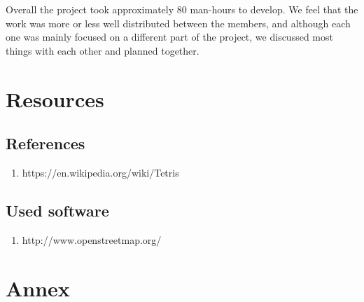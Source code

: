 \documentclass[a4paper]{article}
\begin{document}
Overall the project took approximately 80 man-hours to develop. We feel that the work was more or less well distributed between the members, and although each one was mainly focused on a different part of the project, we discussed most things with each other and planned together.

\section{Resources}

\subsection{References}

\begin{enumerate}
	
	\item https://en.wikipedia.org/wiki/Tetris
	
\end{enumerate}

\subsection{Used software} \label{openStreet}
\begin{enumerate}
	
\item http://www.openstreetmap.org/

\end{enumerate}

\newpage
\appendix

\section{Annex}\label{}




	
\end{document}
